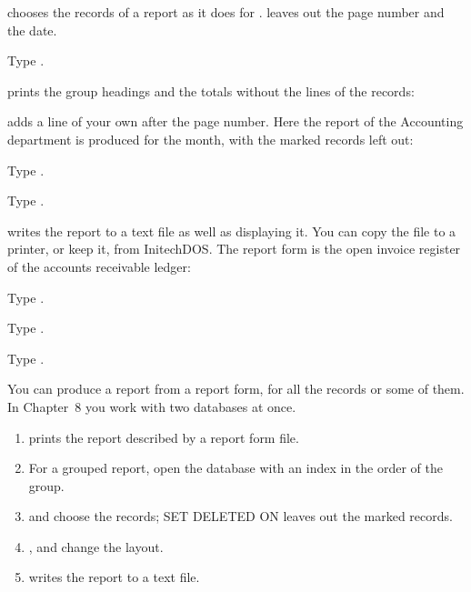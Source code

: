  chooses the records of a report as it does for .
 leaves out the page number and the date.
\begin{Steps}[resume]
\item Type .
\end{Steps}

 prints the group headings and the totals without the lines of the
records:

 adds a line of your own after the page number.  Here the report of
the Accounting department is produced for the month, with the marked records
left out:
\begin{Steps}[resume]
\item Type .
\item Type .
\end{Steps}

 writes the report to a text file as well as displaying it.  You can
copy the file to a printer, or keep it, from InitechDOS.  The report form
 is the open invoice register of the accounts receivable
ledger:
\begin{Steps}[resume]
\item Type .
\item Type .
\item Type .
\end{Steps}

You can produce a report from a report form, for all the records or some of
them.  In Chapter~8 you work with two databases at once.

\begin{enumerate}
\item {}  prints the report described by a report form
  file.
\item For a grouped report, open the database with an index in the order of the
  group.
\item {} and  choose the records; SET DELETED ON leaves out the
  marked records.
\item {},  and  change the layout.
\item {}  writes the report to a text file.
\end{enumerate}
